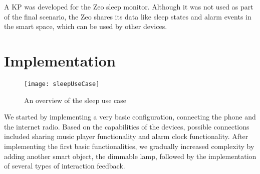 % 
% 
% 
% 
% 
A \ac{KP} was developed for the Zeo sleep monitor. Although it was not used as part of the final scenario, the Zeo shares its data like sleep states and alarm events in the smart space, which can be used by other devices.
 





\section{Implementation}
\label{D3Implementation}
  
\begin{figure}
\centering
\texttt{[image: sleepUseCase]}
\caption{An overview of the sleep use case}
\label{sleep}
\end{figure}


We started by implementing a very basic configuration, connecting the phone and the internet radio. Based on the capabilities of the devices, possible connections included sharing music player functionality and alarm clock functionality. After implementing the first basic functionalities, we gradually increased complexity by adding another smart object, the dimmable lamp, followed by the implementation of several types of interaction feedback.

